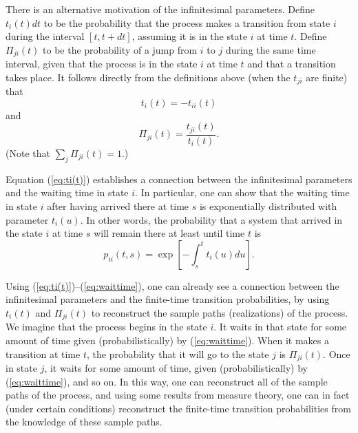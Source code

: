 \documentclass[12pt]{article}
\newcommand{\be}{\begin{equation}}
\newcommand{\ee}{\end{equation}}
\begin{document}
There is an alternative motivation of the infinitesimal parameters.
Define $t_{i}(t)dt$ to be the probability that the process makes a
transition from state $i$ during the interval $[t,t+dt]$, assuming it
is in the state $i$ at time $t$.  Define $\Pi_{ji}(t)$ to be the
probability of a jump from $i$ to $j$ during the same time interval,
given that the process is in the state $i$ at time $t$ and that a
transition takes place.  It follows directly from the definitions
above (when the $t_{ji}$ are finite) that
\be
\label{eq:ti(t)}
t_i(t) = -t_{ii}(t)
\ee
and
\be
\label{eq:Piji(t)}
\Pi_{ji}(t) = \frac{t_{ji}(t)}{t_{i}(t)}.
\ee
(Note that $\sum_j\Pi_{ji}(t)=1$.)

Equation (\ref{eq:ti(t)}) establishes a connection between the
infinitesimal parameters and the waiting time in state $i$.  In
particular, one can show that the waiting time in state $i$ after
having arrived there at time $s$ is exponentially distributed with
parameter $t_{i}(u)$.  In other words, the probability that a system
that arrived in the state $i$ at time $s$ will remain there at least
until time $t$ is
\be
\label{eq:waittime}
p_{ii}(t,s) = \exp \left[ { -\int_{s}^{t}t_{i}(u)du } \right].
\ee

Using (\ref{eq:ti(t)})--(\ref{eq:waittime}), one can already see a
connection between the infinitesimal parameters and the finite-time
transition probabilities, by using $t_{i}(t)$ and $\Pi_{ji}(t)$ to
reconstruct the sample paths (realizations) of the process.  We
imagine that the process begins in the state $i$.  It waits in that
state for some amount of time given (probabilistically) by
(\ref{eq:waittime}).  When it makes a transition at time $t$, the
probability that it will go to the state $j$ is $\Pi_{ji}(t)$.  Once
in state $j$, it waits for some amount of time, given
(probabilistically) by (\ref{eq:waittime}), and so on.  In this way,
one can reconstruct all of the sample paths of the process, and using
some results from measure theory, one can in fact (under certain
conditions) reconstruct the finite-time transition probabilities from
the knowledge of these sample paths.
\end{document}
